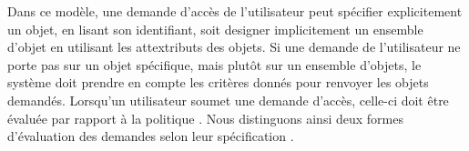 
Dans ce modèle, une demande d'accès de l'utilisateur peut spécifier explicitement un objet, en lisant son identifiant, soit designer implicitement un ensemble d'objet en utilisant les attextributs des objets. Si une demande de l'utilisateur ne porte pas sur un objet spécifique, mais plutôt sur un ensemble d'objets, le système doit prendre en compte les critères donnés pour renvoyer les objets demandés. Lorsqu'un utilisateur soumet une demande d'accès, celle-ci doit être évaluée par rapport à la politique . Nous distinguons ainsi deux formes d'évaluation des demandes selon leur spécification \cite{rajpoot15}.



